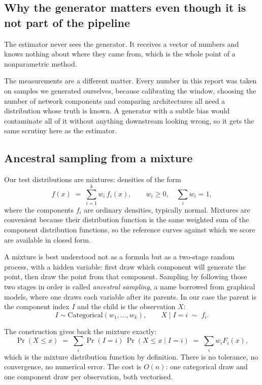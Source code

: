 \documentclass[11pt]{article}
\begin{document}
\subsection{Why the generator matters even though it is not part of the pipeline}

The estimator never sees the generator. It receives a vector of numbers and knows nothing
about where they came from, which is the whole point of a nonparametric method.

The measurements are a different matter. Every number in this report was taken on samples we
generated ourselves, because calibrating the window, choosing the number of network components
and comparing architectures all need a distribution whose truth is known. A generator with a
subtle bias would contaminate all of it without anything downstream looking wrong, so it gets
the same scrutiny here as the estimator.

\subsection{Ancestral sampling from a mixture}

Our test distributions are mixtures: densities of the form
\begin{equation}
f(x) \;=\; \sum_{i=1}^{k} w_i\, f_i(x), \qquad w_i \ge 0, \quad \sum_i w_i = 1 ,
\label{eq:mixture}
\end{equation}
where the components $f_i$ are ordinary densities, typically normal. Mixtures are convenient
because their distribution function is the same weighted sum of the component distribution
functions, so the reference curves against which we score are available in closed form.

A mixture is best understood not as a formula but as a two-stage random process, with a
hidden variable: first draw which component will generate the point, then draw the point
from that component. Sampling by following those two stages in order is called
\emph{ancestral sampling}, a name borrowed from graphical models, where one draws each
variable after its parents. In our case the parent is the component index $I$ and the child
is the observation $X$:
\[
I \sim \text{Categorical}(w_1,\dots,w_k), \qquad X \mid I = i \;\sim\; f_i .
\]

The construction gives back the mixture exactly:
\[
\Pr(X \le x) \;=\; \sum_i \Pr(I = i)\, \Pr(X \le x \mid I = i) \;=\; \sum_i w_i F_i(x),
\]
which is the mixture distribution function by definition. There is no tolerance, no
convergence, no numerical error. The cost is $O(n)$: one categorical draw and one
component draw per observation, both vectorised.
\end{document}
